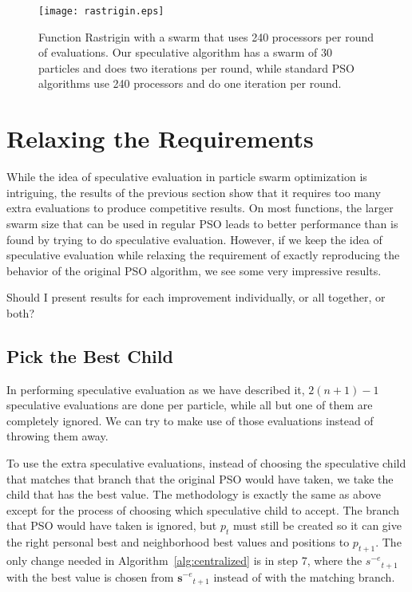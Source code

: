 \documentclass[journal,letterpaper]{IEEEtran}
\newcommand{\alg}[1]{Algorithm~\ref{alg:#1}}
\providecommand{\noeval}[1]{\ensuremath{#1^{-e}}}
\providecommand{\p}{\ensuremath{p}}
\providecommand{\s}{\ensuremath{s}}
\providecommand{\sset}{\ensuremath{\mathbf{s}}}
\begin{document}
\begin{figure}
  \centering
  \texttt{[image: rastrigin.eps]}
  \caption{Function Rastrigin with a swarm that uses 240 processors per round
  of evaluations.  Our speculative algorithm has a swarm of 30 particles and
  does two iterations per round, while standard PSO algorithms use 240
  processors and do one iteration per round.}
  \label{fig:rastrigin}
\end{figure}

\section{Relaxing the Requirements}
\label{sec:relax}

While the idea of speculative evaluation in particle swarm optimization is
intriguing, the results of the previous section show that it requires too many
extra evaluations to produce competitive results.  On most functions, the
larger swarm size that can be used in regular PSO leads to better performance
than is found by trying to do speculative evaluation.  However, if we keep the
idea of speculative evaluation while relaxing the requirement of exactly
reproducing the behavior of the original PSO algorithm, we see some very
impressive results.

Should I present results for each improvement individually, or all together, or
both?

\subsection{Pick the Best Child}

In performing speculative evaluation as we have described it, $2(n+1)-1$
speculative evaluations are done per particle, while all but one of them are
completely ignored.  We can try to make use of those evaluations instead of
throwing them away.  

To use the extra speculative evaluations, instead of choosing the speculative
child that matches that branch that the original PSO would have taken, we take
the child that has the best value.  The methodology is exactly the same as
above except for the process of choosing which speculative child to accept.
The branch that PSO would have taken is ignored, but $\p_t$ must still be
created so it can give the right personal best and neighborhood best values and
positions to $\p_{t+1}$.  The only change needed in \alg{centralized} is in
step 7, where the $\noeval{\s}_{t+1}$ with the best value is chosen from
$\noeval{\sset}_{t+1}$ instead of with the matching branch.
\end{document}
